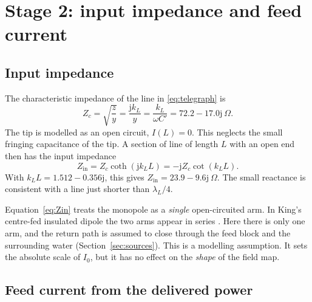 \documentclass[11pt,a4paper]{article}
\newcommand{\jj}{\mathrm{j}}
\begin{document}
\section{Stage 2: input impedance and feed current}\label{sec:feed}

\subsection{Input impedance}

The characteristic impedance of the line in \eqref{eq:telegraph} is
\begin{equation}
  Z_c = \sqrt{\frac{z}{y}} = \frac{\jj k_L}{y} = \frac{k_L}{\omega C'} = 72.2 - 17.0\jj\ \Omega .
\end{equation}
The tip is modelled as an open circuit, $I(L)=0$. This neglects the small fringing capacitance of the tip.
A section of line of length $L$ with an open end then has the input impedance \cite{Pozar2012}
\begin{equation}
  Z_{\text{in}} = Z_c\coth(\jj k_L L) = -\jj Z_c\cot(k_L L).
  \label{eq:Zin}
\end{equation}
With $k_LL = 1.512-0.356\jj$, this gives $Z_{\text{in}} = 23.9 - 9.6\jj\ \Omega$. The small reactance is
consistent with a line just shorter than $\lambda_L/4$.

Equation~\eqref{eq:Zin} treats the monopole as a \emph{single} open-circuited arm. In King's centre-fed
insulated dipole the two arms appear in series \cite{King1983}. Here there is only one arm, and the return
path is assumed to close through the feed block and the surrounding water (Section~\ref{sec:sources}). This is
a modelling assumption. It sets the absolute scale of $I_0$, but it has no effect on the \emph{shape} of the
field map.

\subsection{Feed current from the delivered power}
\end{document}
